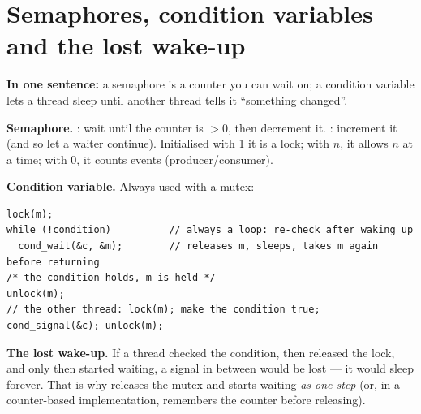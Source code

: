 \documentclass[11pt]{report}
\newcommand{\conceptsection}[1]{\section{#1}}
\begin{document}
\conceptsection{Semaphores, condition variables and the lost wake-up}
\label{c:sync}

\textbf{In one sentence:} a semaphore is a counter you can wait on; a condition variable lets a
thread sleep until another thread tells it ``something changed''.

\textbf{Semaphore.} : wait until the counter is $>0$, then decrement it.
: increment it (and so let a waiter continue). Initialised with 1 it is a lock;
with $n$, it allows $n$ at a time; with 0, it counts events (producer/consumer).

\textbf{Condition variable.} Always used with a mutex:
\begin{lstlisting}[style=cpp]
lock(m);
while (!condition)          // always a loop: re-check after waking up
  cond_wait(&c, &m);        // releases m, sleeps, takes m again before returning
/* the condition holds, m is held */
unlock(m);
// the other thread: lock(m); make the condition true; cond_signal(&c); unlock(m);
\end{lstlisting}

\textbf{The lost wake-up.} If a thread checked the condition, then released the lock, and only
then started waiting, a signal in between would be lost --- it would sleep forever. That is why
 releases the mutex and starts waiting \emph{as one step} (or, in a counter-based
implementation, remembers the counter before releasing).

\begin{center}
\end{center}
\end{document}

